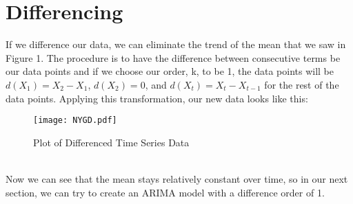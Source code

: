 \documentclass[12pt]{article}
\begin{document}
\section{Differencing}\label{sec:chapter}
If we difference our data, we can eliminate the trend of the mean that we saw in Figure 1. The procedure is to have the difference between consecutive terms be our data points and if we choose our order, k, to be 1, the data points will be \(d(X_1) = X_2 - X_1\), \(d(X_2) = 0\), and \(d(X_t) = X_t - X_{t - 1}\) for the rest of the data points. Applying this transformation, our new data looks like this:\\
\begin{figure}[h!]
\centering
\texttt{[image: NYGD.pdf]}
\caption{Plot of Differenced Time Series Data}
\label{fig:Figure 2}
\end{figure}\\
Now we can see that the mean stays relatively constant over time, so in our next section, we can try to create an ARIMA model with a difference order of 1.
\end{document}
